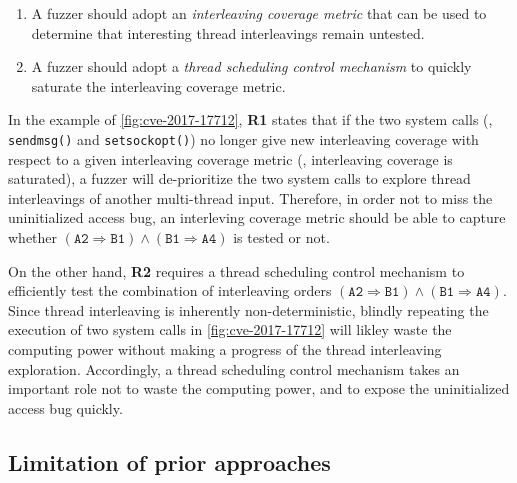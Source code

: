 \vspace{0.4em}
\begin{enumerate}[label=\textbf{R\arabic*:}]
%
\item A fuzzer should adopt an \textit{interleaving coverage metric}
  that can be used to determine that interesting thread interleavings
  remain untested.
\item A fuzzer should adopt a \textit{thread scheduling control
    mechanism} to quickly saturate the interleaving coverage metric.
%
\end{enumerate}


In the example of \autoref{fig:cve-2017-17712}, \textbf{R1} states
that if the two system calls (\ie, \texttt{sendmsg()} and
\texttt{setsockopt()}) no longer give new interleaving coverage with
respect to a given interleaving coverage metric (\ie, interleaving
coverage is saturated), a fuzzer will de-prioritize the two system
calls to explore thread interleavings of another multi-thread input.
%
Therefore, in order not to miss the uninitialized access bug, an
interleving coverage metric should be able to capture whether
$(\texttt{A2} \Rightarrow \texttt{B1}) \wedge (\texttt{B1} \Rightarrow
\texttt{A4})$ is tested or not.


On the other hand, \textbf{R2} requires a thread scheduling control
mechanism to efficiently test the combination of interleaving orders
$(\texttt{A2} \Rightarrow \texttt{B1}) \wedge (\texttt{B1} \Rightarrow
\texttt{A4})$.
%
Since thread interleaving is inherently non-deterministic, blindly
repeating the execution of two system calls in
\autoref{fig:cve-2017-17712} will likley waste the computing power
without making a progress of the thread interleaving exploration.
%
Accordingly, a thread scheduling control mechanism takes an important
role not to waste the computing power, and to expose the uninitialized
access bug quickly.




%


\subsection{Limitation of prior approaches}
\label{ss:existingapproaches}

\begin{table}[t]
  \centering
  
  \caption{Recent fuzzing works to discover concurrency bugs in the
    kernel, and their interleaving coverage metrics (\textbf{R1}) and
    thread scheduling control mechanisms (\textbf{R2}). ``--''
    indicates that a fuzzer does not adopt a concurrency coverage
    metric.
    }
  \label{table:motivation}
\end{table}

